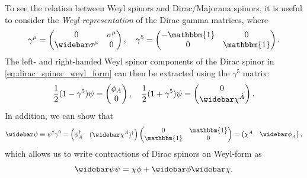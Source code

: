 To see the relation between Weyl spinors and Dirac/Majorana spinors, it is useful to consider the \emph{Weyl representation} of the Dirac gamma matrices, where
\begin{equation}
    \gamma^\mu = \begin{pmatrix}
        0 & \sigma^\mu \\ \widebar\sigma^\mu & 0
    \end{pmatrix}, \quad \gamma^5 = \begin{pmatrix}
        -\mathbbm{1} & 0 \\ 0 & \mathbbm{1}
    \end{pmatrix}.
\end{equation}
The left- and right-handed Weyl spinor components of the Dirac spinor in \cref{eq:dirac_spinor_weyl_form} can then be extracted using the $\gamma^5$ matrix:
\begin{equation}
    \frac{1}{2}(1-\gamma^5) \psi = \begin{pmatrix}
        \phi_A \\ 0
    \end{pmatrix}, \quad \frac{1}{2}(1+\gamma^5) \psi = \begin{pmatrix}
        0 \\ \widebar\chi^{\dot{A}}
    \end{pmatrix}.
\end{equation}
In addition, we can show that
\begin{equation}
    \widebar\psi \equiv \psi^\dagger \gamma^0 = \begin{pmatrix}
        \phi_A^\dagger & (\widebar\chi^{\dot{A}})^\dagger
        \end{pmatrix} \begin{pmatrix}
            0 & \mathbbm{1} \\ \mathbbm{1} & 0
        \end{pmatrix} = \begin{pmatrix}
            \chi^A & \widebar\phi_{\dot{A}}
    \end{pmatrix},
\end{equation}
which allows us to write contractions of Dirac spinors on Weyl-form as
\begin{equation}
    \widebar\psi\psi = \chi\phi + \widebar\phi\widebar\chi.
\end{equation}

